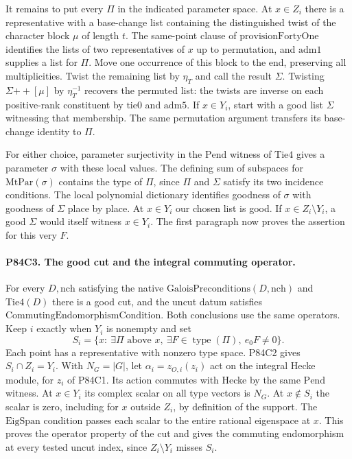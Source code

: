 It remains to put every $\Pi$ in the indicated parameter space.
At $x\in Z_i$ there is a representative with a base-change list
containing the distinguished twist of the character block
$\mu$ of length $t$. The same-point clause of
$\mathrm{provisionFortyOne}$ identifies the lists of two
representatives of $x$ up to permutation, and $\mathrm{adm1}$
supplies a list for $\Pi$. Move one occurrence of this block
to the end, preserving all multiplicities. Twist the remaining
list by $\eta_T$ and call the result $\Sigma$. Twisting
$\Sigma\mathbin{+\!+}[\mu]$ by $\eta_T^{-1}$ recovers the
permuted list: the twists are inverse on each positive-rank
constituent by $\mathrm{tie0}$ and $\mathrm{adm5}$. If
$x\in Y_i$, start with a good list $\Sigma$ witnessing that
membership. The same permutation argument transfers its
base-change identity to $\Pi$.

For either choice, parameter surjectivity in the
$\mathrm{Pend}$ witness of $\mathrm{Tie4}$ gives a parameter
$\sigma$ with these local values. The defining sum of subspaces
for $\mathrm{MtPar}(\sigma)$ contains the type of $\Pi$,
since $\Pi$ and $\Sigma$ satisfy its two incidence conditions.
The local polynomial dictionary identifies goodness of $\sigma$
with goodness of $\Sigma$ place by place. At $x\in Y_i$ our
chosen list is good. If $x\in Z_i\setminus Y_i$, a good
$\Sigma$ would itself witness $x\in Y_i$. The first paragraph
now proves the assertion for this very $F$.

\paragraph{P84C3. The good cut and the integral commuting operator.}
For every $D,\mathrm{nch}$ satisfying the native
$\mathrm{GaloisPreconditions}(D,\mathrm{nch})$ and
$\mathrm{Tie4}(D)$ there is a good cut, and the uncut datum
satisfies $\mathrm{CommutingEndomorphismCondition}$. Both
conclusions use the same operators. Keep $i$ exactly when
$Y_i$ is nonempty and set
\[
 S_i=\{x:\ \exists\Pi\text{ above }x,\ \exists F\in
       \operatorname{type}(\Pi),\ e_0F\ne0\}.
\]
Each point has a representative with nonzero type space. P84C2
gives $S_i\cap Z_i=Y_i$. With $N_G=|G|$, let
$\alpha_i=z_{O,i}(z_i)$ act on the integral Hecke module, for
$z_i$ of P84C1. Its action commutes with Hecke by the same
$\mathrm{Pend}$ witness. At $x\in Y_i$ its complex scalar on
all type vectors is $N_G$. At $x\notin S_i$ the scalar is zero,
including for $x$ outside $Z_i$, by definition of the support.
The $\mathrm{EigSpan}$ condition passes each scalar to the entire
rational eigenspace at $x$. This proves the operator property
of the cut and gives the commuting endomorphism at every tested
uncut index, since $Z_i\setminus Y_i$ misses $S_i$.

